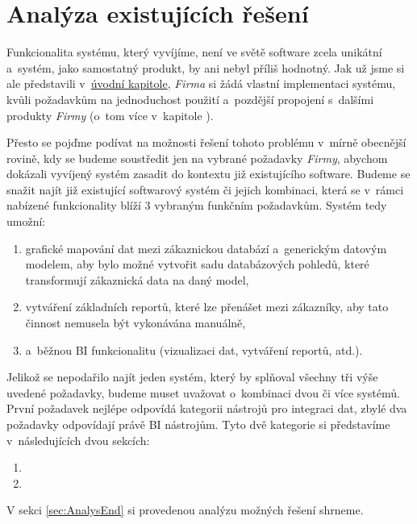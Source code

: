 \chapter{Analýza existujících řešení}\label{chap:analysis}

Funkcionalita systému, který vyvíjíme, není ve světě software zcela unikátní a~systém, jako samostatný produkt, by ani nebyl příliš hodnotný.
Jak už jsme si ale představili v~\hyperref[chap:intro]{úvodní kapitole}, \textit{Firma} si žádá vlastní implementaci systému, kvůli požadavkům na jednoduchost použití a~pozdější propojení s~dalšími produkty \textit{Firmy} (o~tom více v~kapitole ).

Přesto se pojďme podívat na možnosti řešení tohoto problému v~mírně obecnější rovině, kdy se budeme soustředit jen na vybrané požadavky \textit{Firmy}, abychom dokázali vyvíjený systém zasadit do kontextu již existujícího software.
Budeme se snažit najít již existující softwarový systém či jejich kombinaci, která se v~rámci nabízené funkcionality blíží 3 vybraným funkčním požadavkům. Systém tedy umožní:

\begin{enumerate}
    \item grafické mapování dat mezi zákaznickou databází a~generickým datovým modelem, aby bylo možné vytvořit sadu databázových pohledů, které transformují zákaznická data na daný model,
    \item vytváření základních reportů, které lze přenášet mezi zákazníky, aby tato činnost nemusela být vykonávána manuálně,
    \item a~běžnou BI funkcionalitu (vizualizaci dat, vytváření reportů, atd.).
\end{enumerate}

Jelikož se nepodařilo najít jeden systém, který by splňoval všechny tři výše uvedené požadavky, budeme muset uvažovat o~kombinaci dvou či více systémů.
První požadavek nejlépe odpovídá kategorii nástrojů pro integraci dat, zbylé dva požadavky odpovídají právě BI nástrojům.
Tyto dvě kategorie si představíme v~následujících dvou sekcích:

\begin{enumerate}
    \item {}
    \item {}
\end{enumerate}

V sekci \ref{sec:AnalysEnd} si provedenou analýzu možných řešení shrneme.

